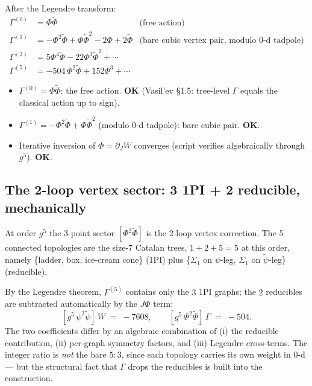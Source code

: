 \documentclass[11pt,a4paper]{article}
\begin{document}
After the Legendre transform:
\begin{align*}
\Gamma^{(0)} &= \Phi\tilde\Phi & \text{(free action)} \\
\Gamma^{(1)} &= -\Phi^2\tilde\Phi + \Phi\tilde\Phi^2 - 2\Phi + 2\tilde\Phi & \text{(bare cubic vertex pair, modulo 0-d tadpole)} \\
\Gamma^{(3)} &= 5\Phi^4\tilde\Phi - 22\Phi^3\tilde\Phi^2 + \cdots & \\
\Gamma^{(5)} &= -504\,\Phi^2\tilde\Phi + 152\Phi^3 + \cdots &
\end{align*}

\begin{exbox}
\begin{itemize}[leftmargin=2em,itemsep=2pt]
  \item $\Gamma^{(0)} = \Phi\tilde\Phi$: the free action. \textbf{OK} (Vasil'ev \S1.5: tree-level $\Gamma$ equals the classical action up to sign).
  \item $\Gamma^{(1)} = -\Phi^2\tilde\Phi + \Phi\tilde\Phi^2$ (modulo 0-d tadpole): bare cubic pair. \textbf{OK}.
  \item Iterative inversion of $\Phi=\partial_J W$ converges (script verifies algebraically through $g^5$). \textbf{OK}.
\end{itemize}
\end{exbox}

\subsection{The 2-loop vertex sector: 3 1PI + 2 reducible, mechanically}

At order $g^5$ the 3-point sector $[\Phi^2\tilde\Phi]$ is the 2-loop vertex
correction. The 5 connected topologies are the size-7 Catalan trees,
$1+2+5=5$ at this order, namely \{ladder, box, ice-cream cone\} (1PI) plus
\{$\Sigma_1$ on $\psi$-leg, $\Sigma_1$ on $\tilde\psi$-leg\} (reducible).

By the Legendre theorem, $\Gamma^{(5)}$ contains only the $3$ 1PI graphs;
the $2$ reducibles are subtracted automatically by the $J\Phi$ term:
\[
[g^5\,\psi^2\tilde\psi]\,W \;=\; -7608,
\qquad
[g^5\,\Phi^2\tilde\Phi]\,\Gamma \;=\; -504.
\]
The two coefficients differ by an algebraic combination of (i) the reducible
contribution, (ii) per-graph symmetry factors, and (iii) Legendre cross-terms.
The integer ratio is \emph{not} the bare $5\!:\!3$, since each topology carries
its own weight in 0-d --- but the structural fact that $\Gamma$ drops the
reducibles is built into the construction.
\end{document}
